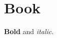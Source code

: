 \documentclass{book}
\begin{document}
\chapter{Book}\textbf{Bold} and \textit{italic}.
\end{document}
